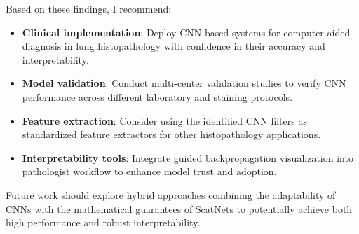 \documentclass[10pt,twocolumn]{article}
\begin{document}
Based on these findings, I recommend:
\begin{itemize}
    \item \textbf{Clinical implementation}: Deploy CNN-based systems for computer-aided diagnosis in lung histopathology with confidence in their accuracy and interpretability.
    \item \textbf{Model validation}: Conduct multi-center validation studies to verify CNN performance across different laboratory and staining protocols.
    \item \textbf{Feature extraction}: Consider using the identified CNN filters as standardized feature extractors for other histopathology applications.
    \item \textbf{Interpretability tools}: Integrate guided backpropagation visualization into pathologist workflow to enhance model trust and adoption.
\end{itemize}

Future work should explore hybrid approaches combining the adaptability of CNNs with the mathematical guarantees of ScatNets to potentially achieve both high performance and robust interpretability.
\end{document}
